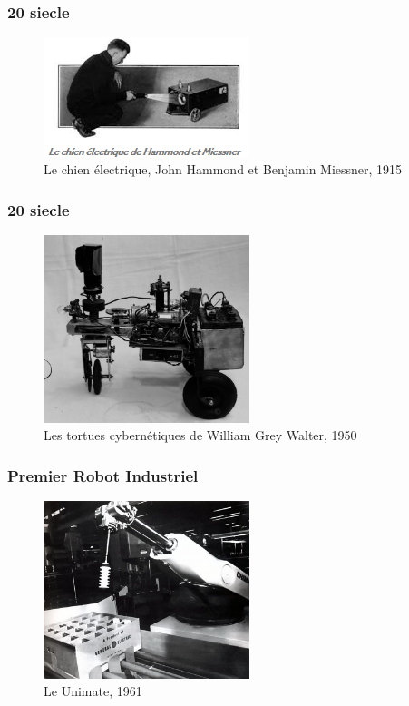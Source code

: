 \documentclass{beamer}
\begin{document}
\begin{frame}
  \frametitle{20 siecle}
  \begin{figure}[!h]
  \centering
  \includegraphics[width=6cm]{chien-electrique-hammond-miessner.png}
  \caption{Le chien électrique, John Hammond et Benjamin Miessner, 1915}
  \end{figure}
\end{frame}

\begin{frame}
  \frametitle{20 siecle}
  \begin{figure}[!h]
  \centering
  \includegraphics[width=6cm]{ELSIE-Time-Life1950.jpg}
  \caption{Les tortues cybernétiques de William Grey Walter, 1950}
  \end{figure}
\end{frame}

\begin{frame}
  \frametitle{Premier Robot Industriel}
  \begin{figure}[!h]
  \centering
  \includegraphics[width=6cm]{1961.jpg}
  \caption{Le Unimate, 1961}
  \end{figure}
\end{frame}
  
\end{document}
